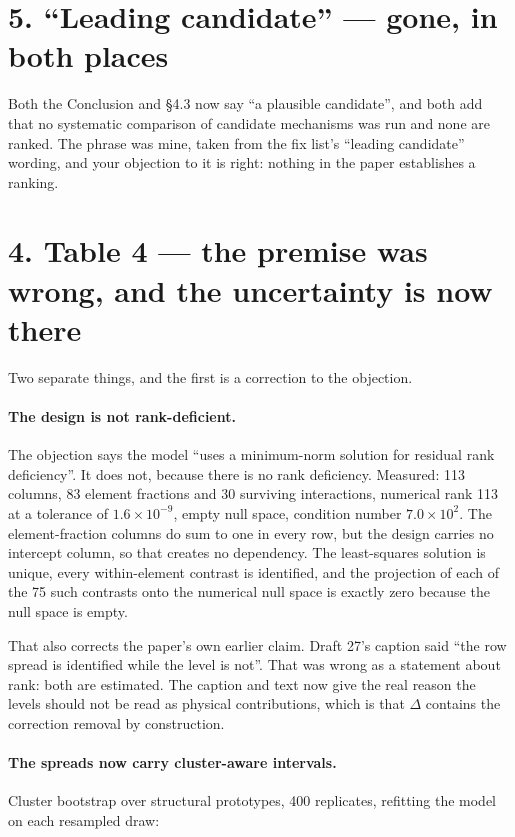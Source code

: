 \documentclass[11pt]{article}
\begin{document}
\section*{5. ``Leading candidate'' --- gone, in both places}

Both the Conclusion and \S4.3 now say ``a plausible candidate'', and both add that no
systematic comparison of candidate mechanisms was run and none are ranked. The phrase was
mine, taken from the fix list's ``leading candidate'' wording, and your objection to it is
right: nothing in the paper establishes a ranking.

\section*{4. Table 4 --- the premise was wrong, and the uncertainty is now there}

Two separate things, and the first is a correction to the objection.

\paragraph{The design is not rank-deficient.} The objection says the model ``uses a
minimum-norm solution for residual rank deficiency''. It does not, because there is no
rank deficiency. Measured: 113 columns, 83 element fractions and 30 surviving interactions,
numerical rank 113 at a tolerance of $1.6\times10^{-9}$, empty null space, condition number
$7.0\times10^{2}$. The element-fraction columns do sum to one in every row, but the design
carries no intercept column, so that creates no dependency. The least-squares solution is
unique, every within-element contrast is identified, and the projection of each of the 75
such contrasts onto the numerical null space is exactly zero because the null space is
empty.

That also corrects the paper's own earlier claim. Draft 27's caption said ``the row spread
is identified while the level is not''. That was wrong as a statement about rank: both are
estimated. The caption and text now give the real reason the levels should not be read as
physical contributions, which is that $\Delta$ contains the correction removal by
construction.

\paragraph{The spreads now carry cluster-aware intervals.} Cluster bootstrap over
structural prototypes, 400 replicates, refitting the model on each resampled draw:
\end{document}
